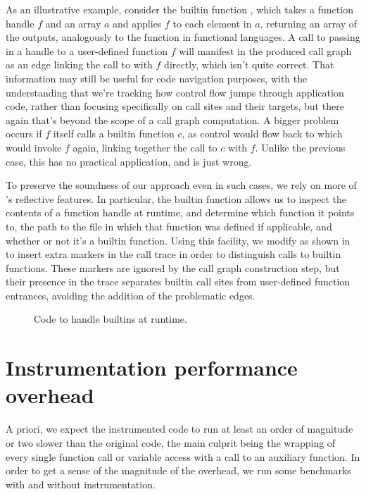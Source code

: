 As an illustrative example, consider the builtin function ,
which takes a function handle $f$ and an array $a$ and applies $f$ to each
element in $a$, returning an array of the outputs, analogously to the
 function in functional languages. A call to  passing
in a handle to a user-defined function $f$ will manifest in the produced call
graph as an edge linking the call to  with $f$ directly, which
isn't quite correct. That information may still be useful for code navigation
purposes, with the understanding that we're tracking how control flow jumps
through application code, rather than focusing specifically on call sites and
their targets, but there again that's beyond the scope of a call graph
computation. A bigger problem occurs if $f$ itself calls a builtin function
$c$, as control would flow back to  which would invoke $f$
again, linking together the call to $c$ with $f$. Unlike the previous case,
this has no practical application, and is just wrong.

To preserve the soundness of our approach even in such cases, we rely on more
of \matlab's reflective features. In particular, the  builtin
function allows us to inspect the contents of a function handle at runtime, and
determine which function it points to, the path to the file in which that
function was defined if applicable, and whether or not it's a builtin function.
Using this facility, we modify  as shown
in  to insert extra markers in the call trace in
order to distinguish calls to builtin functions. These markers are ignored by
the call graph construction step, but their presence in the trace separates
builtin call sites from user-defined function entrances, avoiding the addition
of the problematic edges.

\begin{figure}[htbp]
  
\caption{Code to handle builtins at runtime.}
\label{Fig:LogThenRunBuiltin}
\end{figure}


\section{Instrumentation performance overhead}

A priori, we expect the instrumented code to run at least an order of magnitude
or two slower than the original code, the main culprit being the wrapping of
every single function call or variable access with a call to an auxiliary
function. In order to get a sense of the magnitude of the overhead, we run some
benchmarks with and without instrumentation.

